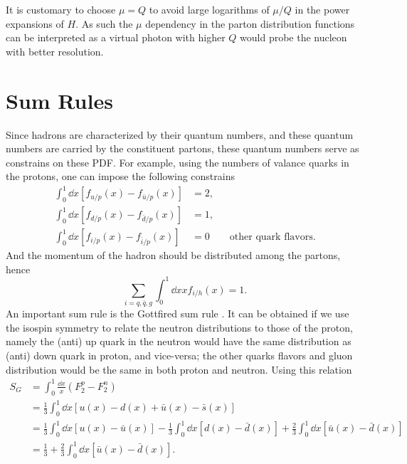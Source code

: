 \documentclass[../main.tex]{subfiles}
\begin{document}
It is customary to choose $\mu =Q$ to avoid large logarithms of $\mu /Q$ in the
power expansions of $H$. As such the $\mu$ dependency in the parton distribution
functions can be interpreted as a virtual photon with higher $Q$ would probe the
nucleon with better resolution.

\section{Sum Rules}
\label{sec:sum_rules}
Since hadrons are characterized by their quantum numbers, and these quantum numbers
are carried by the constituent partons, these quantum numbers serve as constrains
on these PDF. For example, using the numbers of valance quarks in the protons,
one can impose the following constrains
\begin{equation}
	\begin{split}
		\int_{0}^{1} \dd{x} \left[f_{u/p} \left(x\right)-f_{\bar{u}/p} \left(x\right)\right]&=2,\\
		\int_{0}^{1} \dd{x} \left[f_{d/p} \left(x\right)-f_{\bar{d}/p} \left(x\right)\right]&=1,\\
		\int_{0}^{1} \dd{x} \left[f_{i/p} \left(x\right)-f_{\bar{i}/p} \left(x\right)\right]&=0 \qquad \text{other quark flavors}.
	\end{split}
\end{equation}
And the momentum of the hadron should be distributed among the partons, hence
\begin{equation}
	\sum_{i=q,\bar{q},g}\int_{0}^{1} \dd{x} xf_{i/h}\left(x\right)=1.
\end{equation}
An important sum rule is the Gottfired sum rule \cite{gottfried1967}. It can be obtained
if we use the isospin symmetry to relate the neutron distributions to those of
the proton, namely the (anti) up quark in the neutron would have the same distribution
as (anti) down quark in proton, and vice-versa; the other quarks flavors and gluon
distribution would be the same in both proton and neutron. Using this relation
\begin{equation}
	\begin{split}
		S_G & = \int_0^1 \frac{\dd{x}}{x}\left(F_2^{p} - F_{2}^{n}\right)\\
		& = \frac{1}{3} \int_0^1 \dd{x} \left[u\left(x\right) - d\left(x\right)
			+ \bar{u}\left(x\right) - \bar{s}\left(x\right)\right]\\
		& = \frac{1}{3} \int_0^1 \dd{x} \left[u\left(x\right) - \bar{u}\left(x\right)\right]
		- \frac{1}{3} \int_0^1 \dd{x} \left[d\left(x\right) - \bar{d}\left(x\right)\right]
		+ \frac{2}{3} \int_0^1 \dd{x} \left[\bar{u}\left(x\right)-\bar{d}\left(x\right)\right]\\
		& = \frac{1}{3} + \frac{2}{3} \int_0^1 \dd{x} \left[\bar{u}\left(x\right)-\bar{d}\left(x\right)\right].
	\end{split}
\end{equation}
\end{document}
